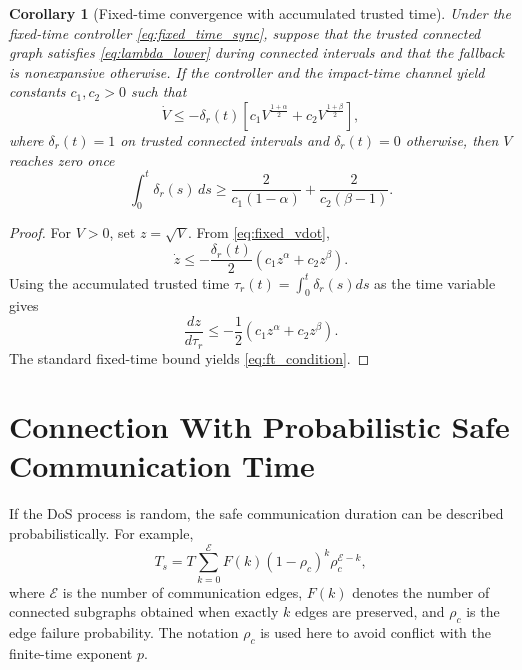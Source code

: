 \documentclass[lettersize,journal]{IEEEtran}
\newtheorem{corollary}{Corollary}
\begin{document}
\begin{corollary}[Fixed-time convergence with accumulated trusted time]
Under the fixed-time controller \eqref{eq:fixed_time_sync}, suppose that the trusted connected graph satisfies \eqref{eq:lambda_lower} during connected intervals and that the fallback is nonexpansive otherwise. If the controller and the impact-time channel yield constants $c_1,c_2>0$ such that
\begin{equation}
    \dot V
    \le
    -\delta_r(t)
    \left[
    c_1 V^{\frac{1+\alpha}{2}}
    +
    c_2 V^{\frac{1+\beta}{2}}
    \right],
    \label{eq:fixed_vdot}
\end{equation}
where $\delta_r(t)=1$ on trusted connected intervals and $\delta_r(t)=0$ otherwise, then $V$ reaches zero once
\begin{equation}
    \int_0^t \delta_r(s)\,ds
    \ge
    \frac{2}{c_1(1-\alpha)}
    +
    \frac{2}{c_2(\beta-1)}.
    \label{eq:ft_condition}
\end{equation}
\end{corollary}

\begin{proof}
For $V>0$, set $z=\sqrt{V}$. From \eqref{eq:fixed_vdot},
\begin{equation}
    \dot z
    \le
    -\frac{\delta_r(t)}{2}
    \left(c_1 z^\alpha+c_2 z^\beta\right).
\end{equation}
Using the accumulated trusted time $\tau_r(t)=\int_0^t\delta_r(s)ds$ as the time variable gives
\begin{equation}
    \frac{dz}{d\tau_r}
    \le
    -\frac{1}{2}
    \left(c_1 z^\alpha+c_2 z^\beta\right).
\end{equation}
The standard fixed-time bound yields \eqref{eq:ft_condition}.
\end{proof}

\section{Connection With Probabilistic Safe Communication Time}

If the DoS process is random, the safe communication duration can be described probabilistically. For example,
\begin{equation}
    T_s
    =
    T\sum_{k=0}^{\mathcal{E}}
    F(k)(1-\rho_c)^k\rho_c^{\mathcal{E}-k},
    \label{eq:prob_safe_time}
\end{equation}
where $\mathcal{E}$ is the number of communication edges, $F(k)$ denotes the number of connected subgraphs obtained when exactly $k$ edges are preserved, and $\rho_c$ is the edge failure probability. The notation $\rho_c$ is used here to avoid conflict with the finite-time exponent $p$.
\end{document}
